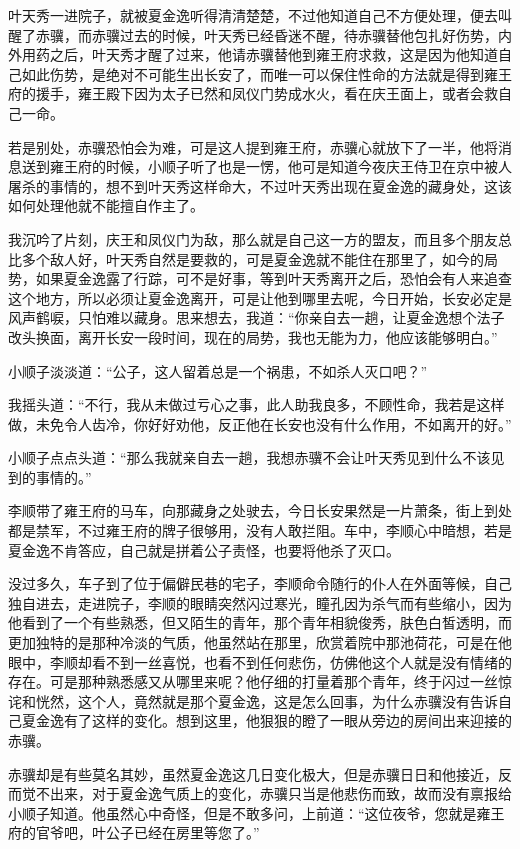 叶天秀一进院子，就被夏金逸听得清清楚楚，不过他知道自己不方便处理，便去叫醒了赤骥，而赤骥过去的时候，叶天秀已经昏迷不醒，待赤骥替他包扎好伤势，内外用药之后，叶天秀才醒了过来，他请赤骥替他到雍王府求救，这是因为他知道自己如此伤势，是绝对不可能生出长安了，而唯一可以保住性命的方法就是得到雍王府的援手，雍王殿下因为太子已然和凤仪门势成水火，看在庆王面上，或者会救自己一命。

若是别处，赤骥恐怕会为难，可是这人提到雍王府，赤骥心就放下了一半，他将消息送到雍王府的时候，小顺子听了也是一愣，他可是知道今夜庆王侍卫在京中被人屠杀的事情的，想不到叶天秀这样命大，不过叶天秀出现在夏金逸的藏身处，这该如何处理他就不能擅自作主了。

我沉吟了片刻，庆王和凤仪门为敌，那么就是自己这一方的盟友，而且多个朋友总比多个敌人好，叶天秀自然是要救的，可是夏金逸就不能住在那里了，如今的局势，如果夏金逸露了行踪，可不是好事，等到叶天秀离开之后，恐怕会有人来追查这个地方，所以必须让夏金逸离开，可是让他到哪里去呢，今日开始，长安必定是风声鹤唳，只怕难以藏身。思来想去，我道：“你亲自去一趟，让夏金逸想个法子改头换面，离开长安一段时间，现在的局势，我也无能为力，他应该能够明白。”

小顺子淡淡道：“公子，这人留着总是一个祸患，不如杀人灭口吧？”

我摇头道：“不行，我从未做过亏心之事，此人助我良多，不顾性命，我若是这样做，未免令人齿冷，你好好劝他，反正他在长安也没有什么作用，不如离开的好。”

小顺子点点头道：“那么我就亲自去一趟，我想赤骥不会让叶天秀见到什么不该见到的事情的。”

李顺带了雍王府的马车，向那藏身之处驶去，今日长安果然是一片萧条，街上到处都是禁军，不过雍王府的牌子很够用，没有人敢拦阻。车中，李顺心中暗想，若是夏金逸不肯答应，自己就是拼着公子责怪，也要将他杀了灭口。

没过多久，车子到了位于偏僻民巷的宅子，李顺命令随行的仆人在外面等候，自己独自进去，走进院子，李顺的眼睛突然闪过寒光，瞳孔因为杀气而有些缩小，因为他看到了一个有些熟悉，但又陌生的青年，那个青年相貌俊秀，肤色白皙透明，而更加独特的是那种冷淡的气质，他虽然站在那里，欣赏着院中那池荷花，可是在他眼中，李顺却看不到一丝喜悦，也看不到任何悲伤，仿佛他这个人就是没有情绪的存在。可是那种熟悉感又从哪里来呢？他仔细的打量着那个青年，终于闪过一丝惊诧和恍然，这个人，竟然就是那个夏金逸，这是怎么回事，为什么赤骥没有告诉自己夏金逸有了这样的变化。想到这里，他狠狠的瞪了一眼从旁边的房间出来迎接的赤骥。

赤骥却是有些莫名其妙，虽然夏金逸这几日变化极大，但是赤骥日日和他接近，反而觉不出来，对于夏金逸气质上的变化，赤骥只当是他悲伤而致，故而没有禀报给小顺子知道。他虽然心中奇怪，但是不敢多问，上前道：“这位夜爷，您就是雍王府的官爷吧，叶公子已经在房里等您了。”

